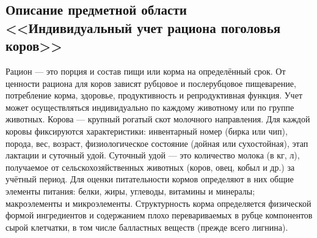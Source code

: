 

\subsection{Описание предметной области <<Индивидуальный учет рациона поголовья коров>>}
Рацион --- это порция и состав пищи или корма на определённый срок. От ценности рациона для коров
 зависят рубцовое и послерубцовое пищеварение, потребление корма, здоровье, продуктивность и репродуктивная функция. 
 Учет может осуществляться индивидуально по каждому животному или по группе животных. Корова --- крупный рогатый 
 скот молочного направления. 
 Для каждой коровы фиксируются характеристики: инвентарный номер (бирка или чип), порода, вес, возраст, 
 физиологическое состояние (дойная или сухостойная), этап лактации и суточный удой. Суточный удой --- 
 это количество молока (в кг, л), получаемое от сельскохозяйственных животных (коров, овец, кобыл и др.)
за учётный период. Для оценки питательности кормов определяют в них общие элементы питания: белки, жиры, углеводы, 
витамины и минералы; макроэлементы и микроэлементы. \cite{koskareva2020} 
Структурность корма определяется физической формой ингредиентов и содержанием плохо перевариваемых в рубце 
компонентов сырой клетчатки, в том числе балластных веществ (прежде всего лигнина).
\cite{ganushchenko2019}
